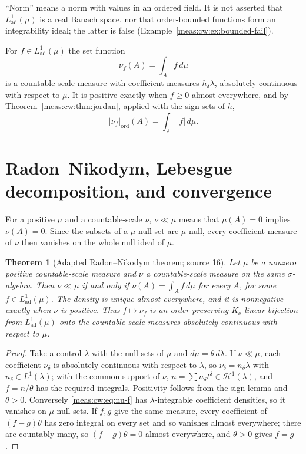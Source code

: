 \documentclass[11pt]{article}
\numberwithin{equation}{section}
\newtheorem{theorem}{Theorem}[section]
\theoremstyle{definition}
\theoremstyle{remark}
\newcommand{\abs}[1]{\lvert#1\rvert}
\newcommand{\Kc}{K_{\mathrm c}}
\newcommand{\Lad}{L^1_{\mathrm{ad}}}
\newcommand{\Hone}[1]{\mathscr H^1(#1)}
\begin{document}
``Norm'' means a norm with values in an ordered field. It is not asserted that
$\Lad(\mu)$ is a real Banach space, nor that order-bounded functions form an
integrability ideal; the latter is false (Example~\ref{meas:cw:ex:bounded-fail}).

For $f\in\Lad(\mu)$ the set function
\begin{equation}\label{meas:cw:eq:nu-f}
 \nu_f(A)=\int_Af\,d\mu
\end{equation}
is a countable-scale measure with coefficient measures $h_\delta\lambda$, absolutely
continuous with respect to $\mu$. It is positive exactly when $f\ge0$ almost
everywhere, and by Theorem~\ref{meas:cw:thm:jordan}, applied with the sign sets of
$h$,
\begin{equation}\label{meas:cw:eq:weighted-variation}
 \abs{\nu_f}_{\mathrm{ord}}(A)=\int_A\abs f\,d\mu .
\end{equation}

\section{Radon--Nikodym, Lebesgue decomposition, and convergence}
\label{meas:cw:sec:rn}

For a positive $\mu$ and a countable-scale $\nu$, $\nu\ll\mu$ means that
$\mu(A)=0$ implies $\nu(A)=0$. Since the subsets of a $\mu$-null set are
$\mu$-null, every coefficient measure of $\nu$ then vanishes on the whole null
ideal of $\mu$.

\begin{theorem}[Adapted Radon--Nikodym theorem; source 16]\label{meas:cw:thm:rn}
Let $\mu$ be a nonzero positive countable-scale measure and $\nu$ a
countable-scale measure on the same $\sigma$-algebra. Then $\nu\ll\mu$ if and only
if $\nu(A)=\int_Af\,d\mu$ for every $A$, for some $f\in\Lad(\mu)$. The density is
unique almost everywhere, and it is nonnegative exactly when $\nu$ is positive.
Thus $f\mapsto\nu_f$ is an order-preserving $\Kc$-linear bijection from $\Lad(\mu)$
onto the countable-scale measures absolutely continuous with respect to $\mu$.
\end{theorem}
\begin{proof}
Take a control $\lambda$ with the null sets of $\mu$ and $d\mu=\theta\,d\lambda$. If
$\nu\ll\mu$, each coefficient $\nu_\delta$ is absolutely continuous with respect to
$\lambda$, so $\nu_\delta=n_\delta\lambda$ with $n_\delta\in L^1(\lambda)$; with the common
support of $\nu$, $n=\sum n_\delta t^\delta\in\Hone{\lambda}$, and $f=n/\theta$ has the
required integrals. Positivity follows from the sign lemma and $\theta>0$.
Conversely \eqref{meas:cw:eq:nu-f} has $\lambda$-integrable coefficient densities,
so it vanishes on $\mu$-null sets. If $f,g$ give the same measure, every
coefficient of $(f-g)\theta$ has zero integral on every set and so vanishes almost
everywhere; there are countably many, so $(f-g)\theta=0$ almost everywhere, and
$\theta>0$ gives $f=g$.
\end{proof}
\end{document}
